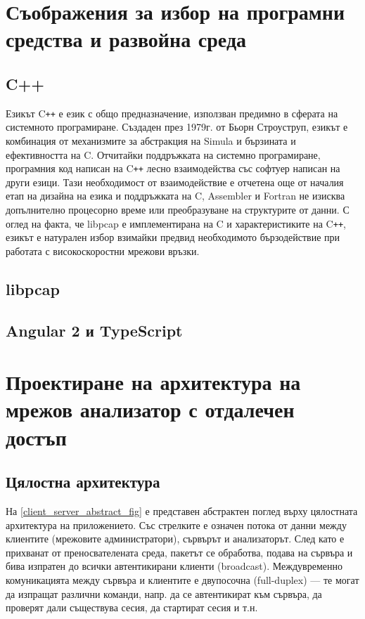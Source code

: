 \documentclass[12pt,a4paper,oneside]{book}
\begin{document}
\section{Съображения за избор на програмни средства и развойна среда}

\subsection{C++}

Езикът C\texttt{++} е език с общо предназначение, използван предимно в сферата на
системното програмиране. Създаден през 1979г. от Бьорн Строуструп, езикът е
комбинация от механизмите за абстракция на Simula и бързината и
ефективността на C. Отчитайки поддръжката на системно програмиране,
програмния код написан на C\texttt{++} лесно взаимодейства със софтуер написан
на други езици. Тази необходимост от взаимодействие е отчетена още от началия
етап на дизайна на езика и поддръжката на C, Assembler и Fortran не изисква
допълнително процесорно време или преобразуване на структурите от данни.
\cite{stroustrup_c++_2013} С оглед на факта, че libpcap е имплементирана на C и
характеристиките на C\texttt{++}, езикът е натурален избор взимайки предвид
необходимото бързодействие при работата с високоскоростни мрежови връзки.

\subsection{libpcap}

\subsection{Angular 2 и TypeScript}

\section{Проектиране на архитектура на мрежов анализатор с отдалечен достъп}

\subsection{Цялостна архитектура}

На \autoref{client_server_abstract_fig} е представен абстрактен поглед върху
цялостната архитектура на приложението. Със стрелките е означен потока от
данни между клиентите (мрежовите администратори), сървърът и анализаторът. След
като е прихванат от преносвателената среда, пакетът се обработва, подава на
сървъра и бива изпратен до всички автентикирани клиенти (broadcast).
Междувременно комуникацията между сървъра и клиентите е двупосочна (full-duplex)
--- те могат да изпращат различни команди, напр. да се автентикират към сървъра,
да проверят дали съществува сесия, да стартират сесия и т.н.
\end{document}
